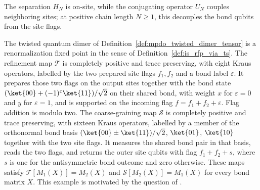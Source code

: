 The separation $H_N$ is on-site, while the conjugating operator $U_N$ couples
neighboring sites; at positive chain length $N \ge 1$, this decouples the bond
qubits from the site flags.

\begin{lemma}%
    \label{thm:mpdo_twisted_dimer_is_rfp_via_ts}
    \leanok
    The twisted quantum dimer of
    Definition~\ref{def:mpdo_twisted_dimer_tensor} is a renormalization fixed
    point in the sense of Definition~\ref{def:is_rfp_via_ts}.
    The refinement map $\mathcal T$ is completely positive and trace preserving,
    with eight Kraus operators, labelled by the two prepared site flags
    $f_1,f_2$ and a bond label $\varepsilon$. It prepares those two flags
    on the output sites together with the bond state
    $(\ket{00}+(-1)^\varepsilon\ket{11})/\sqrt2$ on their shared bond,
    with weight $x$ for $\varepsilon=0$ and $y$ for $\varepsilon=1$,
    and is supported on the incoming flag $f=f_1+f_2+\varepsilon$.
    Flag addition is modulo two.
    The coarse-graining map $\mathcal S$ is completely positive and trace
    preserving, with sixteen Kraus operators, labelled by a member of the orthonormal
    bond basis $(\ket{00}\pm\ket{11})/\sqrt2$, $\ket{01}$, $\ket{10}$
    together with the two site flags. It measures the shared bond pair
    in that basis, reads the two flags, and returns the outer site qubits
    with flag $f_1+f_2+s$, where $s$ is one for the antisymmetric bond
    outcome and zero otherwise. These maps satisfy
    $\mathcal T[M_1(X)]=M_2(X)$ and $\mathcal S[M_2(X)]=M_1(X)$
    for every bond matrix $X$.
    This example is motivated by the question of
    \cite[lines~995--1010]{Cirac2016MPDO_arXiv}.
\end{lemma}
